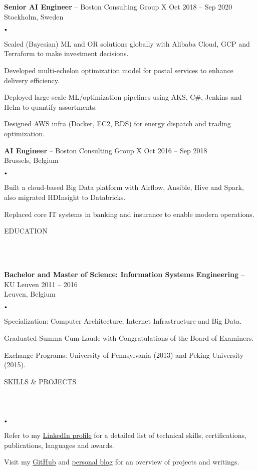 \documentclass{article}
\newcommand{\header}[1]{
    {
        \hspace*{-4pt}
        \vspace*{8pt}
        \uppercase{#1}
    }
    \vspace*{-4pt} 
    \lineunder
    \vspace*{8pt}
}
\newcommand{\lineunder}{
    \vspace*{-8pt} \\ 
    \hspace*{-4pt} 
    \hrulefill \\
}
\newcommand{\experience}[5]{
    \vspace*{2pt}
    \textbf{#1} -- #2 \hfill #3 \\ 
    #4 \\
    #5
    \vspace*{2pt}
}
\newcommand{\spacedbullet}{
    $\vcenter{\hbox{\tiny$\bullet$}}$\hspace*{-2pt}
}
\newenvironment{bulletlist}{
    \begin{list}
        {\spacedbullet}{\setlength\leftmargin{10pt} 
        \topsep 0pt \itemsep -2pt}}{\vspace*{4pt}
    \end{list}
}
\begin{document}
\experience{Senior AI Engineer}{Boston Consulting Group X}{Oct 2018 -- Sep 2020}{Stockholm, Sweden}
{
    \begin{bulletlist}
        \item Scaled (Bayesian) ML and OR solutions globally with Alibaba Cloud, GCP and Terraform to make investment decisions.
        \item Developed multi-echelon optimization model for postal services to enhance delivery efficiency.
        \item Deployed large-scale ML/optimization pipelines using AKS, C\#, Jenkins and Helm to quantify assortments.
        \item Designed AWS infra (Docker, EC2, RDS) for energy dispatch and trading optimization.
    \end{bulletlist}
}

\experience{AI Engineer}{Boston Consulting Group X}{Oct 2016 -- Sep 2018}{Brussels, Belgium}
{
    \begin{bulletlist}
        \item Built a cloud-based Big Data platform with Airflow, Ansible, Hive and Spark, also migrated HDInsight to Databricks.
        \item Replaced core IT systems in banking and insurance to enable modern operations.
    \end{bulletlist}
}

\vspace*{4pt}

\header{Education}
\experience{Bachelor and Master of Science: Information Systems Engineering}{KU Leuven}{2011 -- 2016}{Leuven, Belgium}
{
    \begin{bulletlist}
        \item Specialization: Computer Architecture, Internet Infrastructure and Big Data.
        \item Graduated Summa Cum Laude with Congratulations of the Board of Examiners.
        \item Exchange Programs: University of Pennsylvania (2013) and Peking University (2015).
    \end{bulletlist}
}

\vspace*{4pt}
\header{Skills \& Projects}
\begin{bulletlist}
    \item Refer to my \href{https://linkedin.com/in/nielsdegrande/}{LinkedIn profile} for a detailed list of technical skills, certifications, publications, languages and awards.
    \item Visit my \href{https://github.com/NielsDegrande/}{GitHub} and \href{https://niels.degran.de/blog}{personal blog} for an overview of projects and writings.
\end{bulletlist}
\end{document}
